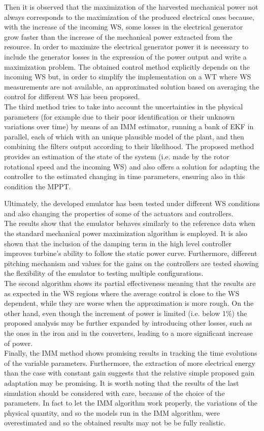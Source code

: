 Then it is observed that the maximization of the harvested mechanical power not always corresponds to the maximization of the produced electrical ones because, with the increase of the incoming WS, some losses in the electrical generator grow faster than the increase of the mechanical power extracted from the resource. In order to maximize the electrical generator power it is necessary to include the generator losses in the expression of the power output and write a maximization problem. The obtained control method explicitly depends on the incoming WS but, in order to simplify the implementation on a WT where WS measurements are not available, an approximated solution based on averaging the control for different WS has been proposed.\\
The third method tries to take into account the uncertainties in the physical parameters (for example due to their poor identification or their unknown variations over time) by means of an \acrfull{IMM} estimator, running a bank of \acrfull{EKF} in parallel, each of which with an unique plausible model of the plant, and then combining the filters output according to their likelihood. The proposed method provides an estimation of the state of the system (i.e. made by the rotor rotational speed and the incoming WS) and also offers a solution for adapting the controller to the estimated changing in time parameters, ensuring also in this condition the MPPT.

Ultimately, the developed emulator has been tested under different WS conditions and also changing the properties of some of the actuators and controllers. \\
The results show that the emulator behaves similarly to the reference data when the standard mechanical power maximization algorithm is employed. It is also shown that the inclusion of the damping term in the high level controller improves turbine's ability to follow the static power curve. Furthermore, different pitching mechanism and values for the gains on the controllers are tested showing the flexibility of the emulator to testing multiple configurations.\\
The second algorithm shows its partial effectiveness meaning that the results are as expected in the WS regions where the average control is close to the WS dependent, while they are worse when the approximation is more rough. On the other hand, even though the increment of power is limited (i.e. below 1\%) the proposed analysis may be further expanded by introducing other losses, such as the ones in the iron and in the converters, leading to a more significant increase of power.\\
Finally, the IMM method shows promising results in tracking the time evolutions of the variable parameters. Furthermore, the extraction of more electrical energy than the case with constant gain suggests that the relative simple proposed gain adaptation may be promising. It is worth noting that the results of the last simulation should be considered with care, because of the choice of the parameters. In fact to let the IMM algorithm work properly, the variations of the physical quantity, and so the models run in the IMM algorithm, were overestimated and so the obtained results may not be be fully realistic. 

